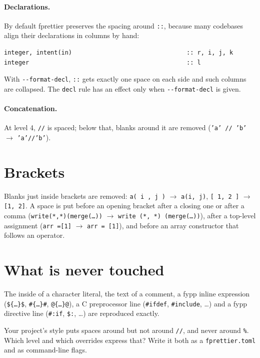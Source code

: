 \documentclass[11pt,a4paper,openany]{book}
\newcommand{\code}[1]{\texttt{\small #1}}
\newcommand{\file}[1]{\texttt{\small\color{accent}#1}}
\newcommand{\flag}[1]{\texttt{\small -{}-#1}}
\newcounter{exercise}[chapter]
\begin{document}
\paragraph{Declarations.} By default fprettier preserves the spacing around
\code{::}, because many codebases align their declarations in columns by hand:

\begin{lstlisting}[style=fortran]
integer, intent(in)                                :: r, i, j, k
integer                                            :: l
\end{lstlisting}

With \flag{format-decl}, \code{::} gets exactly one space on each side and
such columns are collapsed. The \code{decl} rule has an effect only when
\flag{format-decl} is given.

\paragraph{Concatenation.} At level 4, \code{//} is spaced; below that, blanks
around it are removed (\code{'a' // 'b'} $\to$ \code{'a'//'b'}).

\section{Brackets}

Blanks just inside brackets are removed: \code{a( i , j )} $\to$
\code{a(i, j)}, \code{[ 1, 2 ]} $\to$ \code{[1, 2]}. A space is put before an
opening bracket after a closing one or after a comma
(\code{write(*,*)(merge(\ldots))} $\to$ \code{write (*, *) (merge(\ldots))}),
after a top-level assignment (\code{arr =[1]} $\to$ \code{arr = [1]}), and
before an array constructor that follows an operator.

\section{What is never touched}

The inside of a character literal, the text of a comment, a fypp inline
expression (\code{\$\{\ldots\}\$}, \code{\#\{\ldots\}\#}, \code{@\{\ldots\}@}),
a C preprocessor line (\code{\#ifdef}, \code{\#include}, \ldots) and a fypp
directive line (\code{\#:if}, \code{\$:}, \ldots) are reproduced exactly.

\begin{exercise}
Your project's style puts spaces around \code{*} but not around \code{//},
and never around \code{\%}. Which level and which overrides express that? Write
it both as a \file{fprettier.toml} and as command-line flags.
\end{exercise}
\end{document}
